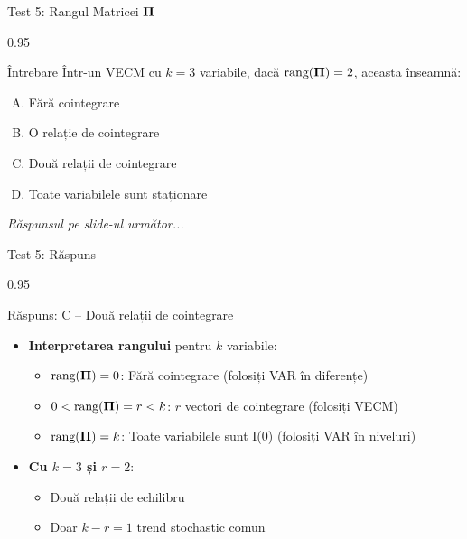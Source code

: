 \documentclass[9pt, aspectratio=169, t]{beamer}
\begin{document}
\begin{frame}{Test 5: Rangul Matricei $\boldsymbol{\Pi}$}
    \begin{cminipage}{0.95\textwidth}
    \begin{alertblock}{Întrebare}
        Într-un VECM cu $k=3$ variabile, dacă $\text{rang}(\boldsymbol{\Pi}) = 2$, aceasta înseamnă:
    \end{alertblock}

    \vspace{0.3cm}

    \begin{enumerate}[A)]\setlength{\itemsep}{0pt}
        \item Fără cointegrare
        \item O relație de cointegrare
        \item Două relații de cointegrare
        \item Toate variabilele sunt staționare
    \end{enumerate}

    \vspace{0.5cm}
    \begin{flushright}\textit{Răspunsul pe slide-ul următor...}\end{flushright}
    \end{cminipage}
\end{frame}

\begin{frame}{Test 5: Răspuns}
    \begin{cminipage}{0.95\textwidth}
    \begin{exampleblock}{Răspuns: C -- Două relații de cointegrare}
        \begin{itemize}\setlength{\itemsep}{0pt}
            \item \textbf{Interpretarea rangului} pentru $k$ variabile:
            \begin{itemize}\setlength{\itemsep}{0pt}
                \item $\text{rang}(\boldsymbol{\Pi}) = 0$: Fără cointegrare (folosiți VAR în diferențe)
                \item $0 < \text{rang}(\boldsymbol{\Pi}) = r < k$: $r$ vectori de cointegrare (folosiți VECM)
                \item $\text{rang}(\boldsymbol{\Pi}) = k$: Toate variabilele sunt I(0) (folosiți VAR în niveluri)
            \end{itemize}
            \item \textbf{Cu $k=3$ și $r=2$}:
            \begin{itemize}\setlength{\itemsep}{0pt}
                \item Două relații de echilibru
                \item Doar $k - r = 1$ trend stochastic comun
            \end{itemize}
        \end{itemize}
    \end{exampleblock}
    \end{cminipage}
\end{frame}
\end{document}
